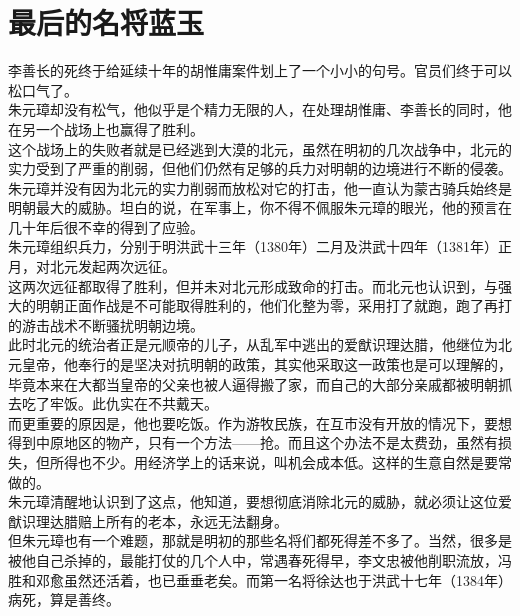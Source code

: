 \section{最后的名将蓝玉}
\ifnum{}
	\begin{multicols}{\theparacolNo}
\fi
李善长的死终于给延续十年的胡惟庸案件划上了一个小小的句号。官员们终于可以松口气了。\\

朱元璋却没有松气，他似乎是个精力无限的人，在处理胡惟庸、李善长的同时，他在另一个战场上也赢得了胜利。\\

这个战场上的失败者就是已经逃到大漠的北元，虽然在明初的几次战争中，北元的实力受到了严重的削弱，但他们仍然有足够的兵力对明朝的边境进行不断的侵袭。\\

朱元璋并没有因为北元的实力削弱而放松对它的打击，他一直认为蒙古骑兵始终是明朝最大的威胁。坦白的说，在军事上，你不得不佩服朱元璋的眼光，他的预言在几十年后很不幸的得到了应验。\\

朱元璋组织兵力，分别于明洪武十三年（1380年）二月及洪武十四年（1381年）正月，对北元发起两次远征。\\

这两次远征都取得了胜利，但并未对北元形成致命的打击。而北元也认识到，与强大的明朝正面作战是不可能取得胜利的，他们化整为零，采用打了就跑，跑了再打的游击战术不断骚扰明朝边境。\\

此时北元的统治者正是元顺帝的儿子，从乱军中逃出的爱猷识理达腊，他继位为北元皇帝，他奉行的是坚决对抗明朝的政策，其实他采取这一政策也是可以理解的，毕竟本来在大都当皇帝的父亲也被人逼得搬了家，而自己的大部分亲戚都被明朝抓去吃了牢饭。此仇实在不共戴天。\\

而更重要的原因是，他也要吃饭。作为游牧民族，在互市没有开放的情况下，要想得到中原地区的物产，只有一个方法——抢。而且这个办法不是太费劲，虽然有损失，但所得也不少。用经济学上的话来说，叫机会成本低。这样的生意自然是要常做的。\\

朱元璋清醒地认识到了这点，他知道，要想彻底消除北元的威胁，就必须让这位爱猷识理达腊赔上所有的老本，永远无法翻身。\\

但朱元璋也有一个难题，那就是明初的那些名将们都死得差不多了。当然，很多是被他自己杀掉的，最能打仗的几个人中，常遇春死得早，李文忠被他削职流放，冯胜和邓愈虽然还活着，也已垂垂老矣。而第一名将徐达也于洪武十七年（1384年）病死，算是善终。\\


\end{multicols}
